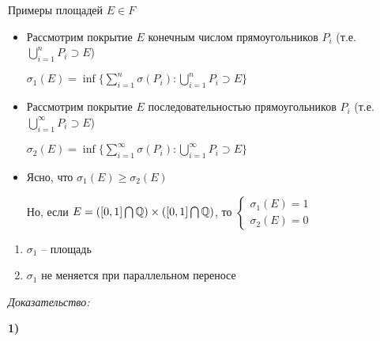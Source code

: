 \documentclass[12pt]{article}
\begin{document}
\begin{Example}{Примеры площадей $E \in F$}
    \begin{itemize}
        \item Рассмотрим покрытие $E$ конечным числом прямоугольников $P_i$ (т.е. $\bigcup\limits_{i = 1}^n P_i \supset E$)
        
        $\sigma_1(E) = \inf\{ \sum\limits_{i = 1}^n \sigma(P_i) : \bigcup\limits_{i = 1}^n P_i \supset E \}$

        \item Рассмотрим покрытие $E$ последовательностью прямоугольников $P_i$ (т.е. $\bigcup\limits_{i = 1}^{\infty} P_i \supset E$)
        
        $\sigma_2(E) = \inf\{ \sum\limits_{i = 1}^{\infty} \sigma(P_i) : \bigcup\limits_{i = 1}^{\infty} P_i \supset E \}$

        \item Ясно, что $\sigma_1(E) \geq \sigma_2(E)$
        
        Но, если $E = ([0, 1] \bigcap \mathbb Q) \times ([0, 1] \bigcap \mathbb Q)$, то $\begin{cases}
            \sigma_1(E) = 1 \\
            \sigma_2(E) = 0
        \end{cases}$
    \end{itemize}
\end{Example}

\begin{theo}{}
    \begin{enumerate}
        \item $\sigma_1$ -- площадь
        \item $\sigma_1$ не меняется при параллельном переносе
    \end{enumerate}
\end{theo}

\textit{Доказательство:}

\textbf{1)}
\end{document}
